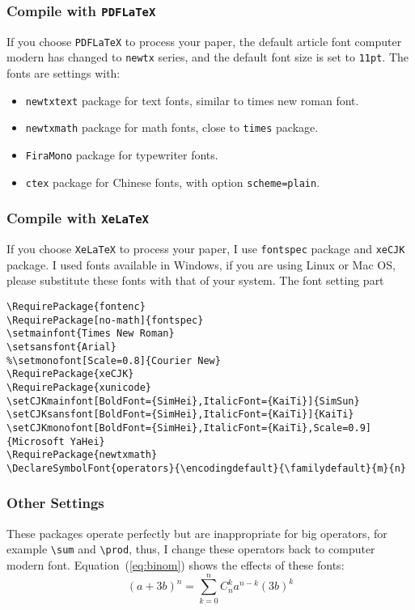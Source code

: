 \documentclass[en]{elegantpaper}
\begin{document}
\subsubsection{Compile with \lstinline{PDFLaTeX}}
If you choose \lstinline{PDFLaTeX} to process your paper, the default article font computer modern has changed to \lstinline{newtx} series, and the default font size is set to \lstinline{11pt}. The fonts are settings with:
\begin{itemize}
	\item \lstinline{newtxtext} package for text fonts, similar to times new roman font.
	\item \lstinline{newtxmath} package for math fonts, close to \lstinline{times} package.
	\item \lstinline{FiraMono} package for typewriter fonts.
	\item \lstinline{ctex} package for Chinese fonts, with option \lstinline{scheme=plain}.
\end{itemize}

\subsubsection{Compile with \lstinline{XeLaTeX}}
If you choose \lstinline{XeLaTeX} to process your paper, I use \lstinline{fontspec} package and \lstinline{xeCJK} package. I used fonts available in Windows, if you are using Linux or Mac OS, please substitute these fonts with that of your system. The font setting part

\begin{lstlisting}
\RequirePackage{fontenc}
\RequirePackage[no-math]{fontspec}
\setmainfont{Times New Roman}
\setsansfont{Arial}
%\setmonofont[Scale=0.8]{Courier New}
\RequirePackage{xeCJK}
\RequirePackage{xunicode}
\setCJKmainfont[BoldFont={SimHei},ItalicFont={KaiTi}]{SimSun}
\setCJKsansfont[BoldFont={SimHei},ItalicFont={KaiTi}]{KaiTi}
\setCJKmonofont[BoldFont={SimHei},ItalicFont={KaiTi},Scale=0.9]{Microsoft YaHei}
\RequirePackage{newtxmath}
\DeclareSymbolFont{operators}{\encodingdefault}{\familydefault}{m}{n}
\end{lstlisting}

\subsubsection{Other Settings}
These packages operate perfectly but are inappropriate for big operators, for example \lstinline{\sum} and \lstinline{\prod}, thus, I change these operators back to computer modern font. Equation~(\eqref{eq:binom}) shows the effects of these fonts:
\begin{equation}
(a+3b)^{n} = \sum_{k=0}^{n} C_{n}^{k} a^{n-k} (3b)^k  \label{eq:binom}
\end{equation}
\end{document}
